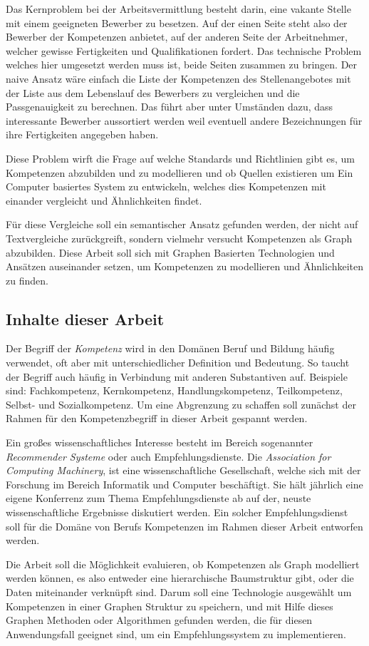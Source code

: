 Das Kernproblem bei der Arbeitsvermittlung besteht darin, eine vakante Stelle mit einem geeigneten Bewerber zu besetzen. Auf der einen Seite steht also der Bewerber der Kompetenzen anbietet, auf der anderen Seite der Arbeitnehmer, welcher gewisse Fertigkeiten und Qualifikationen fordert. Das technische Problem welches hier umgesetzt werden muss ist, beide Seiten zusammen zu bringen. Der naive Ansatz wäre einfach die Liste der Kompetenzen des Stellenangebotes mit der Liste aus dem Lebenslauf des Bewerbers zu vergleichen und die Passgenauigkeit zu berechnen. Das führt aber unter Umständen dazu, dass interessante Bewerber aussortiert werden weil eventuell andere Bezeichnungen für ihre Fertigkeiten angegeben haben. 

Diese Problem wirft die Frage auf welche Standards und Richtlinien gibt es, um Kompetenzen abzubilden und zu modellieren 
und ob Quellen existieren um Ein Computer basiertes System zu entwickeln, welches dies Kompetenzen mit einander vergleicht und Ähnlichkeiten findet. 

Für diese Vergleiche soll ein semantischer Ansatz gefunden werden, der nicht auf Textvergleiche zurückgreift, sondern vielmehr versucht Kompetenzen als Graph abzubilden.
Diese Arbeit soll sich mit Graphen Basierten Technologien und Ansätzen auseinander setzen, um Kompetenzen zu modellieren und Ähnlichkeiten zu finden.

\subsection{Inhalte dieser Arbeit}


Der Begriff der \textit{Kompetenz} wird in den Domänen Beruf und Bildung häufig verwendet, oft aber mit unterschiedlicher Definition und Bedeutung. So taucht der Begriff auch häufig in Verbindung mit anderen Substantiven auf. Beispiele sind: Fachkompetenz, Kernkompetenz, Handlungskompetenz, Teilkompetenz, Selbst- und Sozialkompetenz.
Um eine Abgrenzung zu schaffen soll zunächst der Rahmen für den Kompetenzbegriff in dieser Arbeit gespannt werden. \newline

Ein großes wissenschaftliches Interesse besteht im Bereich sogenannter \textit{Recommender Systeme} oder auch Empfehlungsdienste. Die \textit{Association for Computing Machinery}\cite{acm}, ist eine wissenschaftliche Gesellschaft, welche sich mit der Forschung im Bereich Informatik und Computer beschäftigt. Sie hält jährlich eine eigene Konferrenz\cite{recsys} zum Thema Empfehlungsdienste ab auf der, neuste wissenschaftliche Ergebnisse diskutiert werden. Ein solcher Empfehlungsdienst soll für die Domäne von Berufs Kompetenzen im Rahmen dieser Arbeit entworfen werden. \newline

Die Arbeit soll die Möglichkeit evaluieren, ob Kompetenzen als Graph modelliert werden können, es also entweder eine hierarchische Baumstruktur gibt, oder die Daten miteinander verknüpft sind. Darum soll eine Technologie ausgewählt um Kompetenzen in einer Graphen Struktur zu speichern, und mit Hilfe dieses Graphen Methoden oder Algorithmen gefunden werden, die für diesen Anwendungsfall geeignet sind, um ein Empfehlungssystem zu implementieren.
